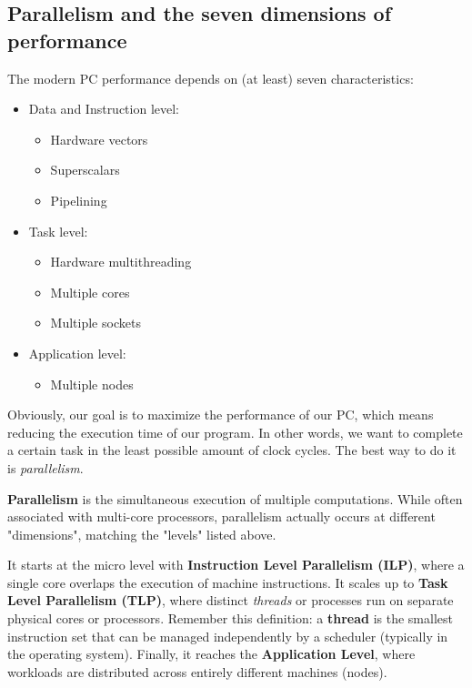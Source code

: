 \subsection{Parallelism and the seven dimensions of performance}
The modern PC performance depends on (at least) seven characteristics:
\begin{itemize}
    \item[-] Data and Instruction level:
    \begin{itemize}
        \item[1] Hardware vectors
        \item[2] Superscalars
        \item[3] Pipelining
    \end{itemize}
    \item[-] Task level:
    \begin{itemize}
        \item[4] Hardware multithreading
        \item[5] Multiple cores
        \item[6] Multiple sockets
    \end{itemize}
    \item[-] Application level: 
    \begin{itemize}
        \item[7] Multiple nodes
    \end{itemize}
\end{itemize}
Obviously, our goal is to maximize the performance of our PC, which means reducing the execution time of our program. In other words, we want to complete a certain task in the least possible amount of clock cycles. The best way to do it is \textit{parallelism}.

\textbf{Parallelism} is the simultaneous execution of multiple computations. While often associated with multi-core processors, parallelism actually occurs at different "dimensions", matching the "levels" listed above. 

It starts at the micro level with \textbf{Instruction Level Parallelism (ILP)}, where a single core overlaps the execution of machine instructions. It scales up to \textbf{Task Level Parallelism (TLP)}, where distinct \textit{threads} or processes run on separate physical cores or processors. Remember this definition: a \textbf{thread} is the smallest instruction set that can be managed independently by a scheduler (typically in the operating system). Finally, it reaches the \textbf{Application Level}, where workloads are distributed across entirely different machines (nodes).

